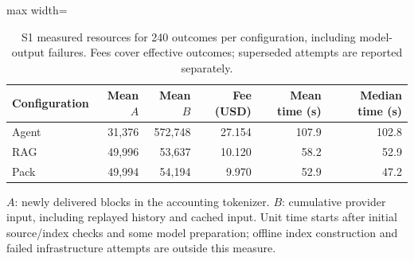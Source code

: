 \begin{table}[t]
\centering
\caption{S1 measured resources for 240 outcomes per configuration, including model-output failures. Fees cover effective outcomes; superseded attempts are reported separately.}\label{tab:resources}
\small
\begin{adjustbox}{max width=\textwidth}\begin{tabular}{lrrrrr}
\toprule
Configuration & Mean $A$ & Mean $B$ & Fee (USD) & Mean time (s) & Median time (s) \\
\midrule
Agent & 31,376 & 572,748 & 27.154 & 107.9 & 102.8 \\
RAG & 49,996 & 53,637 & 10.120 & 58.2 & 52.9 \\
Pack & 49,994 & 54,194 & 9.970 & 52.9 & 47.2 \\
\bottomrule
\end{tabular}\end{adjustbox}
\par\vspace{3pt}\begin{minipage}{\textwidth}\footnotesize $A$: newly delivered blocks in the accounting tokenizer. $B$: cumulative provider input, including replayed history and cached input. Unit time starts after initial source/index checks and some model preparation; offline index construction and failed infrastructure attempts are outside this measure.\end{minipage}
\end{table}
